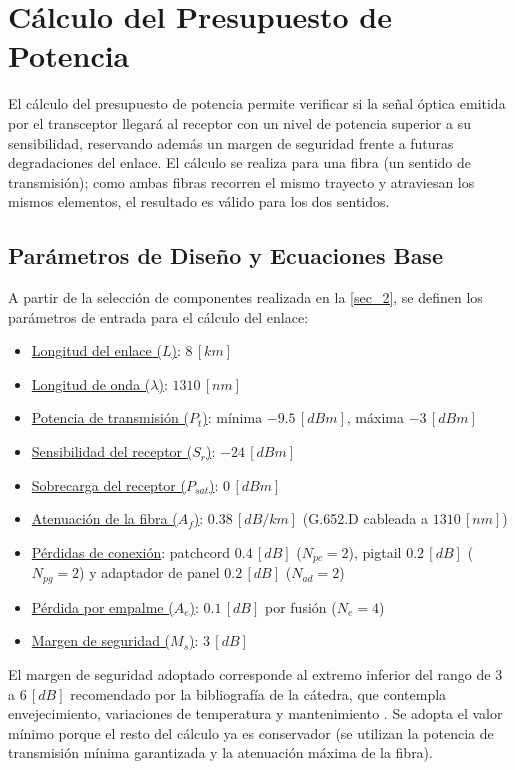 \section{Cálculo del Presupuesto de Potencia}
\label{sec_3}
El cálculo del presupuesto de potencia permite verificar si la señal óptica emitida por el transceptor llegará al receptor con un nivel de potencia superior a su sensibilidad, reservando además un margen de seguridad frente a futuras degradaciones del enlace. El cálculo se realiza para una fibra (un sentido de transmisión); como ambas fibras recorren el mismo trayecto y atraviesan los mismos elementos, el resultado es válido para los dos sentidos.


\subsection{Parámetros de Diseño y Ecuaciones Base}
\label{sec_3_1}
A partir de la selección de componentes realizada en la \autoref{sec_2}, se definen los parámetros de entrada para el cálculo del enlace:
\begin{itemize}
    \item \underline{Longitud del enlace ($L$)}: $8 \, [km]$
    \item \underline{Longitud de onda ($\lambda$)}: $1310 \, [nm]$
    \item \underline{Potencia de transmisión ($P_{t}$)}: mínima $-9.5 \, [dBm]$, máxima $-3 \, [dBm]$
    \item \underline{Sensibilidad del receptor ($S_{r}$)}: $-24 \, [dBm]$
    \item \underline{Sobrecarga del receptor ($P_{sat}$)}: $0 \, [dBm]$
    \item \underline{Atenuación de la fibra ($A_f$)}: $0.38 \, [dB/km]$ (G.652.D cableada a $1310 \, [nm]$)
    \item \underline{Pérdidas de conexión}: patchcord $0.4 \, [dB]$ ($N_{pc} = 2$), pigtail $0.2 \, [dB]$ ($N_{pg} = 2$) y adaptador de panel $0.2 \, [dB]$ ($N_{ad} = 2$)
    \item \underline{Pérdida por empalme ($A_{e}$)}: $0.1 \, [dB]$ por fusión ($N_{e} = 4$)
    \item \underline{Margen de seguridad ($M_s$)}: $3 \, [dB]$
\end{itemize}

El margen de seguridad adoptado corresponde al extremo inferior del rango de $3$ a $6 \, [dB]$ recomendado por la bibliografía de la cátedra, que contempla envejecimiento, variaciones de temperatura y mantenimiento \cite{b7}. Se adopta el valor mínimo porque el resto del cálculo ya es conservador (se utilizan la potencia de transmisión mínima garantizada y la atenuación máxima de la fibra).

